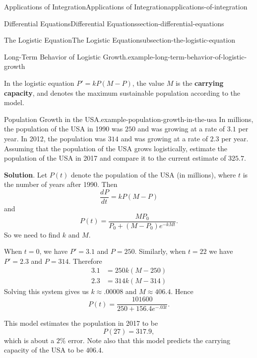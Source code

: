 \documentclass[oneside,10pt,]{book}
\newcommand{\terminology}[1]{\textbf{#1}}
\numberwithin{equation}{section}
\newcommand{\dv}[3][]{\dfrac{d^{#1} #2}{d #3^{#1}}}
\begin{document}
\begin{chapterptx}{Applications of Integration}{}{Applications of Integration}{}{}{applications-of-integration}
\begin{sectionptx}{Differential Equations}{}{Differential Equations}{}{}{section-differential-equations}
\begin{subsectionptx}{The Logistic Equation}{}{The Logistic Equation}{}{}{subsection-the-logistic-equation}
\begin{example}{Long-Term Behavior of Logistic Growth.}{example-long-term-behavior-of-logistic-growth}
\end{example}
\hypertarget{p-747}{}%
In the logistic equation \(P' = kP(M-P)\), the value \(M\) is the \terminology{carrying capacity}, and denotes the maximum sustainable population according to the model.%
\begin{example}{Population Growth in the USA.}{example-population-growth-in-the-usa}%
\hypertarget{p-748}{}%
In millions, the population of the USA in 1990 was \(250\) and was growing at a rate of \(3.1\) per year. In 2012, the population was \(314\) and was growing at a rate of \(2.3\) per year. Assuming that the population of the USA grows logistically, estimate the population of the USA in 2017 and compare it to the current estimate of \(325.7\).%
\par\smallskip%
\noindent\textbf{Solution}.\hypertarget{solution-157}{}\quad%
\hypertarget{p-749}{}%
Let \(P(t)\) denote the population of the USA (in millions), where \(t\) is the number of years after 1990. Then%
\begin{equation*}
\dv{P}{t} = kP(M-P)
\end{equation*}
and%
\begin{equation*}
P(t) = \frac{MP_{0}}{P_{0} + (M - P_{0})e^{-kMt}}.
\end{equation*}
So we need to find \(k\) and \(M\).%
\par
\hypertarget{p-750}{}%
When \(t = 0\), we have \(P' = 3.1\) and \(P = 250\). Similarly, when \(t = 22\) we have \(P' = 2.3\) and \(P = 314\). Therefore%
\begin{align*}
3.1 & = 250k(M - 250) \\
2.3 & = 314k(M - 314) 
\end{align*}
Solving this system gives us \(k\approx.00008\) and \(M \approx 406.4\). Hence%
\begin{equation*}
P(t) = \frac{101600}{250 + 156.4e^{-.03t}}.
\end{equation*}
%
\par
\hypertarget{p-751}{}%
This model estimates the population in 2017 to be%
\begin{equation*}
P(27) = 317.9,
\end{equation*}
which is about a \(2\%\) error. Note also that this model predicts the carrying capacity of the USA to be \(406.4\).%
\end{example}
\end{subsectionptx}
%
%
\typeout{************************************************}
\typeout{************************************************}

\end{sectionptx}
\end{chapterptx}
\end{document}
